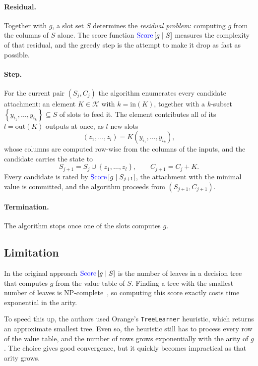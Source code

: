 \documentclass[11pt]{article}
\newcommand{\Score}{\textcolor{blue}{\mathrm{Score}}}
\begin{document}
\paragraph{Residual.} Together with $g$, a slot set $S$ determines the \emph{residual
problem}: computing $g$ from the columns of $S$ alone. The score function
$\Score\left[g \mid S\right]$ measures the complexity of that residual, and the greedy
step is the attempt to make it drop as fast as possible.

\paragraph{Step.} For the current pair $(S_j, C_j)$ the algorithm enumerates every candidate
attachment: an element $K \in \mathcal{K}$ with $k = \mathrm{in}(K)$, together with a
$k$-subset $\left\{y_{i_1}, \dots, y_{i_k}\right\} \subseteq S$ of slots to feed it. The
element contributes all of its $l = \mathrm{out}(K)$ outputs at once, as $l$ new slots
\begin{equation}\label{eq:attach}
    \left(z_1, \dots, z_l\right) = K\left(y_{i_1}, \dots, y_{i_k}\right),
\end{equation}
whose columns are computed row-wise from the columns of the inputs, and the candidate
carries the state to
$$
    S_{j+1} = S_j \cup \left\{z_1, \dots, z_l\right\},
    \qquad
    C_{j+1} = C_j + K.
$$
Every candidate is rated by $\Score\left[g \mid S_{j+1}\right]$, the attachment with the
minimal value is committed, and the algorithm proceeds from $(S_{j+1}, C_{j+1})$.

\paragraph{Termination.} The algorithm stops once one of the slots computes $g$.

\subsection{Limitation}

In the original approach $\Score\left[g \mid S\right]$ is the number of leaves in a
decision tree that computes $g$ from the value table of $S$. Finding a tree with the
smallest number of leaves is NP-complete~\cite{hyafil1976np}, so computing this score
exactly costs time exponential in the arity.

To speed this up, the authors used Orange's \texttt{TreeLearner} heuristic, which returns
an approximate smallest tree. Even so, the heuristic still has to process every row of
the value table, and the number of rows grows exponentially with the arity of $g$. The
choice gives good convergence, but it quickly becomes impractical as that arity grows.
\end{document}
